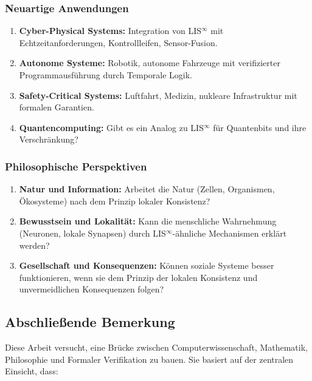 \documentclass[a4paper,12pt]{article}
\theoremstyle{definition}
\begin{document}
	\subsubsection{Neuartige Anwendungen}
	
	\begin{enumerate}
		\item \textbf{Cyber-Physical Systems:} Integration von LIS$^{\infty}$ mit Echtzeitanforderungen, Kontrollleifen, Sensor-Fusion.
		
		\item \textbf{Autonome Systeme:} Robotik, autonome Fahrzeuge mit verifizierter Programmausführung durch Temporale Logik.
		
		\item \textbf{Safety-Critical Systems:} Luftfahrt, Medizin, nukleare Infrastruktur mit formalen Garantien.
		
		\item \textbf{Quantencomputing:} Gibt es ein Analog zu LIS$^{\infty}$ für Quantenbits und ihre Verschränkung?
	\end{enumerate}
	
	\subsubsection{Philosophische Perspektiven}
	
	\begin{enumerate}
		\item \textbf{Natur und Information:} Arbeitet die Natur (Zellen, Organismen, Ökosysteme) nach dem Prinzip lokaler Konsistenz?
		
		\item \textbf{Bewusstsein und Lokalität:} Kann die menschliche Wahrnehmung (Neuronen, lokale Synapsen) durch LIS$^{\infty}$-ähnliche Mechanismen erklärt werden?
		
		\item \textbf{Gesellschaft und Konsequenzen:} Können soziale Systeme besser funktionieren, wenn sie dem Prinzip der lokalen Konsistenz und unvermeidlichen Konsequenzen folgen?
	\end{enumerate}
	
	\subsection{Abschließende Bemerkung}
	
	Diese Arbeit versucht, eine Brücke zwischen Computerwissenschaft, Mathematik, Philosophie und Formaler Verifikation zu bauen. Sie basiert auf der zentralen Einsicht, dass:
	
\end{document}
